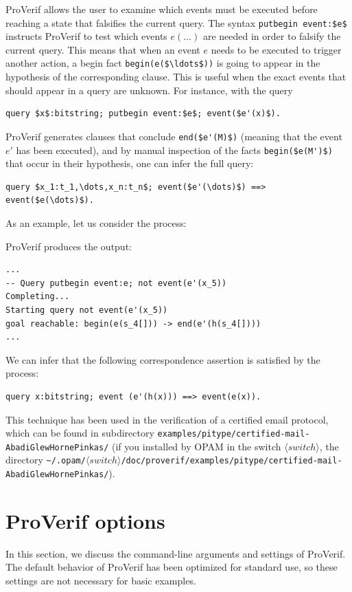 \documentclass{book}
\newcommand{\nonterm}[1]{\langle\mathit{#1}\rangle}
\newcommand{\switchdir}{\nonterm{switch}}
\newcommand{\opamsubdir}[1]{\nolinkurl{~/.opam/}$\switchdir$\nolinkurl{/#1}}
\begin{document}
ProVerif allows the user to examine which events must be executed
before reaching a state that falsifies the current query. The syntax
%
\lstinline!putbegin event:$e$!
%
instructs ProVerif to test which events $e(\ldots)$ are needed in
order to falsify the current query.  This means that when an event $e$
needs to be executed to trigger another action, a begin fact
\lstinline!begin(e($\ldots$))! is going to appear in the hypothesis of
the corresponding clause. This is useful when the exact events that
should appear in a query are unknown. For instance, with the query
%
\begin{lstlisting}[numbers=none]
	query $x$:bitstring; putbegin event:$e$; event($e'(x)$).
\end{lstlisting}
%
ProVerif generates clauses that conclude \lstinline!end($e'(M)$)!
(meaning that the event $e'$ has been executed),
and by manual inspection of the facts \lstinline!begin($e(M')$)!
that occur in their hypothesis, one can infer the full query:
%
\begin{lstlisting}[numbers=none]
	query $x_1:t_1,\dots,x_n:t_n$; event($e'(\dots)$) ==> event($e(\dots)$).
\end{lstlisting}
%
As an example, let us consider the process:
%

%
ProVerif produces the output:
%
\begin{lstlisting}[numbers=none]
...
-- Query putbegin event:e; not event(e'(x_5))
Completing...
Starting query not event(e'(x_5))
goal reachable: begin(e(s_4[])) -> end(e'(h(s_4[])))
...
\end{lstlisting}
%
We can infer that the following correspondence assertion is satisfied by the process:
%
\begin{lstlisting}[numbers=none]
query x:bitstring; event (e'(h(x))) ==> event(e(x)).
\end{lstlisting}
\sloppy
This technique has been used in the verification of a certified email protocol,
which can be found in subdirectory \nolinkurl{examples/pitype/certified-mail-AbadiGlewHornePinkas/} (if you installed by OPAM
in the switch $\switchdir$, the directory \opamsubdir{doc/proverif/examples/pitype/certified-mail-AbadiGlewHornePinkas/}).

\section{ProVerif options}

In this section, we discuss the command-line arguments and settings of ProVerif.
The default behavior of ProVerif has been optimized for standard use, so these
settings are not necessary for basic examples.
\end{document}
